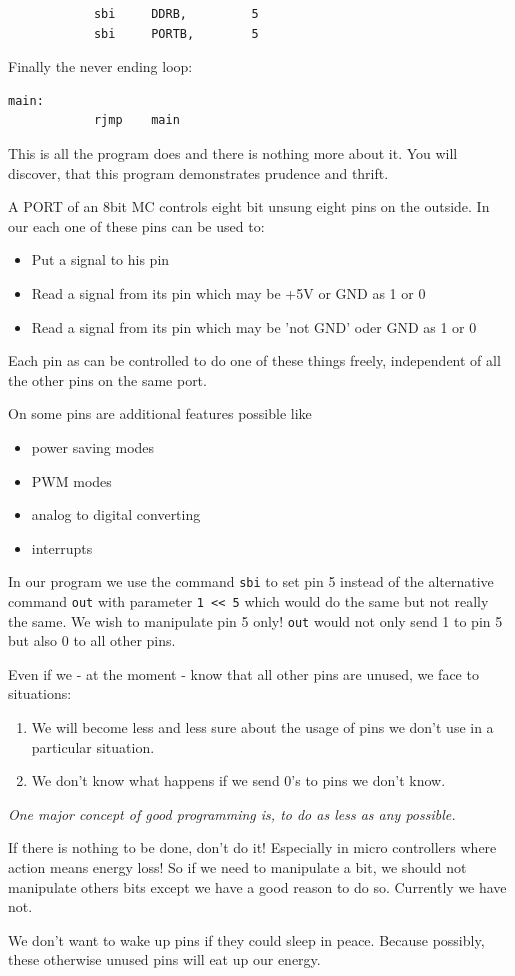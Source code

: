 \begin{lstlisting}
            sbi     DDRB,         5
            sbi     PORTB,        5
\end{lstlisting}

Finally the never ending loop:

\begin{lstlisting}
main:
            rjmp    main
\end{lstlisting}

This is all the program does and there is nothing more about it. You will discover, that this program demonstrates prudence and thrift. 

A PORT of an 8bit MC controls eight bit unsung eight pins on the outside. In our \at each one of these pins can be used to:

\begin{itemize}
  \item Put a signal to his pin
  \item Read a signal from its pin which may be +5V or GND as 1 or 0
  \item Read a signal from its pin which may be 'not GND' oder GND as 1 or 0
\end{itemize}

Each pin as can be controlled to do one of these things freely, independent of all the other pins on the same port.

On some pins are additional features possible like

\begin{itemize}
  \item power saving modes
  \item PWM modes
  \item analog to digital converting
  \item interrupts
\end{itemize}

In our program we use the command \texttt{sbi} to set pin 5 instead of the alternative command \texttt{out} with parameter \texttt{1 << 5} which would do the same but not really the same. We wish to manipulate pin 5 only! \texttt{out} would not only send 1 to pin 5 but also 0 to all other pins.

Even if we - at the moment - know that all other pins are unused, we face to situations:

\begin{enumerate}
  \item We will become less and less sure about the usage of pins we don't use in a particular situation.
  \item We don't know what happens if we send 0's to pins we don't know.
\end{enumerate}

\emph{One major concept of good programming is, to do as less as any possible.}

If there is nothing to be done, don't do it! Especially in micro controllers where action means energy loss! So if we need to manipulate a bit, we should not manipulate others bits except we have a good reason to do so. Currently we have not.

We don't want to wake up pins if they could sleep in peace. Because possibly, these otherwise unused pins will eat up our energy.

